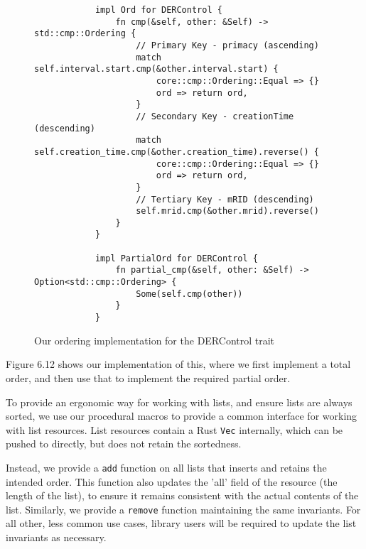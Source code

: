 \begin{figure}[H]
    \begin{center}
        \begin{lstlisting}
            impl Ord for DERControl {
                fn cmp(&self, other: &Self) -> std::cmp::Ordering {
                    // Primary Key - primacy (ascending)
                    match self.interval.start.cmp(&other.interval.start) {
                        core::cmp::Ordering::Equal => {}
                        ord => return ord,
                    }
                    // Secondary Key - creationTime (descending)
                    match self.creation_time.cmp(&other.creation_time).reverse() {
                        core::cmp::Ordering::Equal => {}
                        ord => return ord,
                    }
                    // Tertiary Key - mRID (descending)
                    self.mrid.cmp(&other.mrid).reverse()
                }
            } 

            impl PartialOrd for DERControl {
                fn partial_cmp(&self, other: &Self) -> Option<std::cmp::Ordering> {
                    Some(self.cmp(other))
                }
            }
        \end{lstlisting}
        \label{fig:dercord}
        \caption{Our ordering implementation for the DERControl trait}
    \end{center}
\end{figure}

Figure 6.12 shows our implementation of this, where we first implement a total order, and then use that to implement the required partial order.

To provide an ergonomic way for working with lists, and ensure lists are always sorted, we use our procedural macros to provide a common interface for working with list resources. List resources contain a Rust \texttt{Vec} internally, which can be pushed to directly, but does not retain the sortedness.

Instead, we provide a \texttt{add} function on all lists that inserts and retains the intended order. This function also updates the 'all' field of the resource (the length of the list), to ensure it remains consistent with the actual contents of the list. Similarly, we provide a \texttt{remove} function maintaining the same invariants. For all other, less common use cases, library users will be required to update the list invariants as necessary. 

